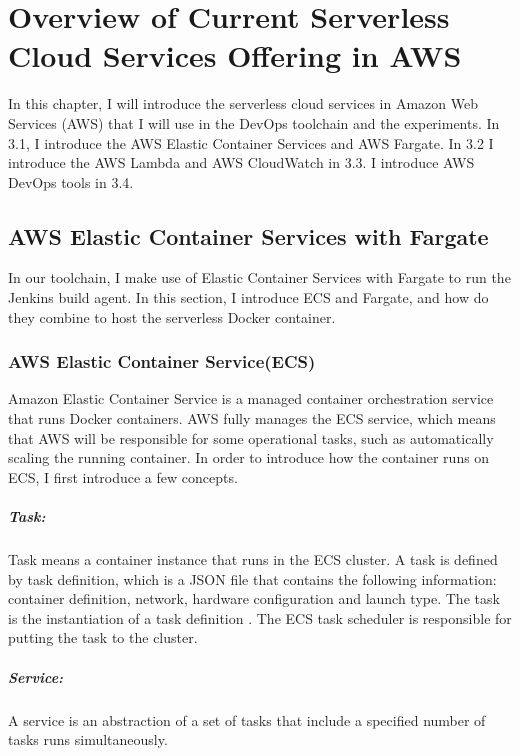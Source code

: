 \chapter{Overview of Current Serverless Cloud Services Offering in AWS}
In this chapter, I will introduce the serverless cloud services in Amazon Web Services (AWS) that I will use in the DevOps toolchain and the experiments.
 In 3.1, I introduce the AWS Elastic Container Services and AWS Fargate. In 3.2 I introduce the AWS Lambda and AWS CloudWatch in 3.3. I introduce AWS DevOps tools in 3.4.
\section{AWS Elastic Container Services with Fargate}
In our toolchain, I make use of Elastic Container Services with Fargate to run the Jenkins build agent. In this section, I introduce ECS and Fargate, and how do they combine to host the serverless Docker container.
\subsection{AWS Elastic Container Service(ECS)}
Amazon Elastic Container Service is a managed container orchestration service that runs Docker containers. AWS fully manages the ECS service, which means that AWS will be responsible for some operational tasks, such as automatically scaling the running container. In order to introduce how the container runs on ECS, I first introduce a few concepts.
\paragraph{Task:} Task means a container instance that runs in the ECS cluster. A task is defined by task definition, which is a JSON file that contains the following information: container definition, network, hardware configuration and launch type. The task is the instantiation of a task definition \cite{WhatisAm71:online}. The ECS task scheduler is responsible for putting the task to the cluster. 
\paragraph{Service:} A service is an abstraction of a set of tasks that include a specified number of tasks runs simultaneously.
